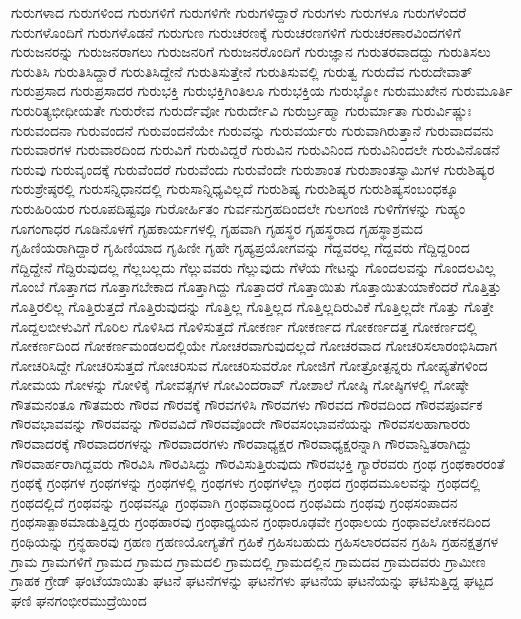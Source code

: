 {ಗುರುಗಳಾದ
ಗುರುಗಳಿಂದ
ಗುರುಗಳಿಗೆ
ಗುರುಗಳಿಗೇ
ಗುರುಗಳಿದ್ದಾರೆ
ಗುರುಗಳು
ಗುರುಗಳೂ
ಗುರುಗಳೆಂದರೆ
ಗುರುಗಳೊಂದಿಗೆ
ಗುರುಗಳೊಡನೆ
ಗುರುಗುಣ
ಗುರುಚರಣಕ್ಕೆ
ಗುರುಚರಣಗಳಿಗೆ
ಗುರುಚರಣಾರವಿಂದಗಳಿಗೆ
ಗುರುಜನರನ್ನು
ಗುರುಜನರಾಗಲು
ಗುರುಜನರಿಗೆ
ಗುರುಜನರೊಂದಿಗೆ
ಗುರುಜ್ಞಾನ
ಗುರುತರವಾದದ್ದು
ಗುರುತಿಸಲು
ಗುರುತಿಸಿ
ಗುರುತಿಸಿದ್ದಾರೆ
ಗುರುತಿಸಿದ್ದೇನೆ
ಗುರುತಿಸುತ್ತೇನೆ
ಗುರುತಿಸುವಲ್ಲಿ
ಗುರುತ್ವ
ಗುರುದೆವ
ಗುರುದೇವಾತ್
ಗುರುಪ್ರಸಾದ
ಗುರುಪ್ರಸಾದರ
ಗುರುಭಕ್ತಿ
ಗುರುಭಕ್ತಿಗಿಂತಿಲೂ
ಗುರುಭಕ್ತಿಯ
ಗುರುಭ್ಯೋ
ಗುರುಮುಖೇನ
ಗುರುಮೂರ್ತಿ
ಗುರುರಿತ್ಯಭೀಧೀಯತೇ
ಗುರುರೇವ
ಗುರುರ್ದೆವೋ
ಗುರುರ್ದೇವಿ
ಗುರುರ್ಬ್ರಹ್ಮಾ
ಗುರುರ್ಮಾತಾ
ಗುರುರ್ವಿಷ್ಣುಃ
ಗುರುವಂದನಾ
ಗುರುವಂದನೆ
ಗುರುವಂದನೆಯೇ
ಗುರುವನ್ನು
ಗುರುವರ್ಯರು
ಗುರುವಾಗಿರುತ್ತಾನೆ
ಗುರುವಾದವನು
ಗುರುವಾರಗಳ
ಗುರುವಾರದಿಂದ
ಗುರುವಿಗೆ
ಗುರುವಿದ್ದರೆ
ಗುರುವಿನ
ಗುರುವಿನಿಂದ
ಗುರುವಿನಿಂದಲೇ
ಗುರುವಿನೊಡನೆ
ಗುರುವು
ಗುರುವೃಂದಕ್ಕೆ
ಗುರುವೆಂದರೆ
ಗುರುವೆಂದು
ಗುರುವೆಂದೇ
ಗುರುಶಾಂತ
ಗುರುಶಾಂತಸ್ವಾಮಿಗಳ
ಗುರುಶಿಷ್ಯರ
ಗುರುಶ್ರೇಷ್ಠರಲ್ಲಿ
ಗುರುಸನ್ನಿಧಾನದಲ್ಲಿ
ಗುರುಸಾನ್ನಿಧ್ಯವಿಲ್ಲದೆ
ಗುರುಶಿಷ್ಯ
ಗುರುಶಿಷ್ಯರ
ಗುರುಶಿಷ್ಯಸಂಬಂಧಕ್ಕೂ
ಗುರುಹಿರಿಯರ
ಗುರೂಪದಿಷ್ಟವೂ
ಗುರೋರ್ಹಿತಂ
ಗುರ್ವನುಗ್ರಹದಿಂದಲೇ
ಗುಲಗಂಜಿ
ಗುಳಿಗೆಗಳನ್ನು
ಗುಹ್ಯಂ
ಗೂಗಂಗಾಧರ
ಗೂಡಿನೊಳಗೆ
ಗೃಹಕಾರ್ಯಗಳಲ್ಲಿ
ಗೃಹವಾಗಿ
ಗೃಹಸ್ಥರ
ಗೃಹಸ್ಥರಾದ
ಗೃಹಸ್ಥಾಶ್ರಮದ
ಗೃಹಿಣಿಯರಾಗಿದ್ದಾರೆ
ಗೃಹಿಣಿಯಾದ
ಗೃಹಿಣೀ
ಗೃಹೇ
ಗೃಹ್ಯಪ್ರಯೋಗವನ್ನು
ಗೆದ್ದವರಲ್ಲ
ಗೆದ್ದವರು
ಗೆದ್ದಿದ್ದರಿಂದ
ಗೆದ್ದಿದ್ದೇನೆ
ಗೆದ್ದಿರುವುದಲ್ಲ
ಗೆಲ್ಲಬಲ್ಲದು
ಗೆಲ್ಲುವವರು
ಗೆಲ್ಲುವುದು
ಗೆಳೆಯ
ಗೇಟನ್ನು
ಗೊಂದಲವನ್ನು
ಗೊಂದಲವಿಲ್ಲ
ಗೊಂಬೆ
ಗೊತ್ತಾಗದ
ಗೊತ್ತಾಗಬೇಕಾದ
ಗೊತ್ತಾಗಿದ್ದು
ಗೊತ್ತಾದರೆ
ಗೊತ್ತಾಯಿತು
ಗೊತ್ತಾಯಿತುಯಾಕೆಂದರೆ
ಗೊತ್ತಿತ್ತು
ಗೊತ್ತಿರಲಿಲ್ಲ
ಗೊತ್ತಿರುತ್ತದೆ
ಗೊತ್ತಿರುವುದನ್ನು
ಗೊತ್ತಿಲ್ಲ
ಗೊತ್ತಿಲ್ಲದ
ಗೊತ್ತಿಲ್ಲದಿರುವಿಕೆ
ಗೊತ್ತಿಲ್ಲದೇ
ಗೊತ್ತು
ಗೊತ್ತೇ
ಗೊದ್ದಲಬೀಳುವಿಗೆ
ಗೊರಿಲ
ಗೊಳಿಸಿದ
ಗೊಳಿಸುತ್ತದೆ
ಗೋಕರ್ಣ
ಗೋಕರ್ಣದ
ಗೋಕರ್ಣದತ್ತ
ಗೋಕರ್ಣದಲ್ಲಿ
ಗೋಕರ್ಣದಿಂದ
ಗೋಕರ್ಣಮಂಡಲದಲ್ಲಿಯೇ
ಗೋಚರವಾಗುವುದಲ್ಲದೆ
ಗೋಚರವಾದ
ಗೋಚರಿಸಲಾರಂಭಿಸಿದಾಗ
ಗೋಚರಿಸಿದ್ದೇ
ಗೋಚರಿಸುತ್ತದೆ
ಗೋಚರಿಸುವ
ಗೋಚರಿಸುವರೋ
ಗೋಜಿಗೆ
ಗೋತ್ರೋತ್ಪನ್ನರು
ಗೋಪ್ಯತೆಗಳಿಂದ
ಗೋಮಯ
ಗೋಳನ್ನು
ಗೋಳಿಕೈ
ಗೋವತ್ಸಗಳ
ಗೋವಿಂದರಾವ್
ಗೋಶಾಲೆ
ಗೋಷ್ಠಿ
ಗೋಷ್ಠಿಗಳಲ್ಲಿ
ಗೋಷ್ಠೇ
ಗೌತಮನಂತೂ
ಗೌತಮರು
ಗೌರವ
ಗೌರವಕ್ಕೆ
ಗೌರವಗಳಿಸಿ
ಗೌರವಗಳು
ಗೌರವದ
ಗೌರವದಿಂದ
ಗೌರವಪೂರ್ವಕ
ಗೌರವಭಾವವನ್ನು
ಗೌರವವನ್ನು
ಗೌರವವಿದೆ
ಗೌರವವೊಂದೇ
ಗೌರವಸಂಭಾವನೆಯನ್ನು
ಗೌರವಸಲಹಾಗಾರರು
ಗೌರವಾದರಕ್ಕೆ
ಗೌರವಾದರಗಳನ್ನು
ಗೌರವಾದರಗಳು
ಗೌರವಾಧ್ಯಕ್ಷರ
ಗೌರವಾಧ್ಯಕ್ಷರನ್ನಾಗಿ
ಗೌರವಾನ್ವಿತರಾಗಿದ್ದು
ಗೌರವಾರ್ಹರಾಗಿದ್ದವರು
ಗೌರವಿಸಿ
ಗೌರವಿಸಿದ್ದು
ಗೌರವಿಸುತ್ತಿರುವುದು
ಗೌರವಭಕ್ತಿ
ಗ್ಯಾರೆರವರು
ಗ್ರಂಥ
ಗ್ರಂಥಕಾರರಂತೆ
ಗ್ರಂಥಕ್ಕೆ
ಗ್ರಂಥಗಳ
ಗ್ರಂಥಗಳನ್ನು
ಗ್ರಂಥಗಳಲ್ಲಿ
ಗ್ರಂಥಗಳು
ಗ್ರಂಥಗಳೆಲ್ಲಾ
ಗ್ರಂಥದ
ಗ್ರಂಥದಮೂಲವನ್ನು
ಗ್ರಂಥದಲ್ಲಿ
ಗ್ರಂಥದಲ್ಲಿದೆ
ಗ್ರಂಥವನ್ನು
ಗ್ರಂಥವನ್ನೂ
ಗ್ರಂಥವಾಗಿ
ಗ್ರಂಥವಾದ್ದರಿಂದ
ಗ್ರಂಥವಿದು
ಗ್ರಂಥವು
ಗ್ರಂಥಸಂಪಾದನ
ಗ್ರಂಥಸಾತ್ಪಾಠಮಾಡುತ್ತಿದ್ದರು
ಗ್ರಂಥಹಾರವು
ಗ್ರಂಥಾಧ್ಯಯನ
ಗ್ರಂಥಾರೂಢವೇ
ಗ್ರಂಥಾಲಯ
ಗ್ರಂಥಾವಲೋಕನದಿಂದ
ಗ್ರಂಥಿಯನ್ನು
ಗ್ರನ್ಥಹಾರವು
ಗ್ರಹಣ
ಗ್ರಹಣಯೋಗ್ಯತೆಗೆ
ಗ್ರಹಿಕೆ
ಗ್ರಹಿಸಬಹುದು
ಗ್ರಹಿಸಲಾರದವನ
ಗ್ರಹಿಸಿ
ಗ್ರಹನಕ್ಷತ್ರಗಳ
ಗ್ರಾಮ
ಗ್ರಾಮಗಳಿಗೆ
ಗ್ರಾಮದ
ಗ್ರಾಮದ
ಗ್ರಾಮದಲಿ
ಗ್ರಾಮದಲ್ಲಿ
ಗ್ರಾಮದಲ್ಲಿನ
ಗ್ರಾಮದವ
ಗ್ರಾಮದವರು
ಗ್ರಾಮೀಣ
ಗ್ರಾಹಕ
ಗ್ರೇಡ್
ಘಂಟೆಯಾಯಿತು
ಘಟನೆ
ಘಟನೆಗಳನ್ನು
ಘಟನೆಗಳು
ಘಟನೆಯ
ಘಟನೆಯನ್ನು
ಘಟಿಸುತ್ತಿದ್ದ
ಘಟ್ಟದ
ಘಣಿ
ಘನಗಂಭೀರಮುದ್ರೆಯಿಂದ
}
